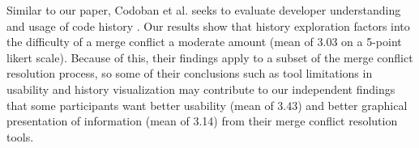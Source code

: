 Similar to our paper, Codoban et al. seeks to evaluate developer understanding and usage of code history \cite{mihai_lenses}. Our results show that history exploration factors into the difficulty of a merge conflict a moderate amount (mean of 3.03 on a 5-point likert scale). Because of this, their findings apply to a subset of the merge conflict resolution process, so some of their conclusions such as tool limitations in usability and history visualization may contribute to our independent findings that some participants want better usability (mean of 3.43) and better graphical presentation of information (mean of 3.14) from their merge conflict resolution tools.